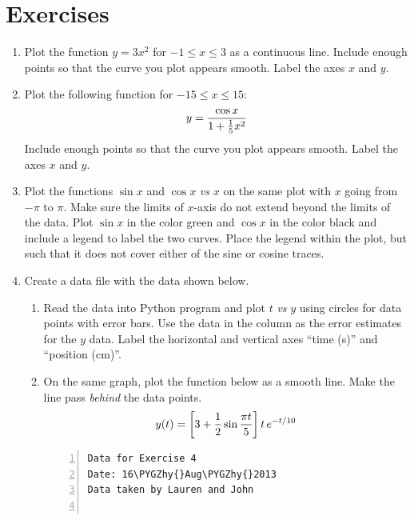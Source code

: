 \documentclass[letterpaper,10pt,english]{sphinxmanual}
\def\PYGZhy{\char`\-}
\begin{document}
\section{Exercises}
\label{chap5/chap5_plot:exercises}\begin{enumerate}
\item {} 
Plot the function \(y=3x^2\) for \(-1 \le x \le 3\) as a continuous line.  Include enough points so that the curve you plot appears smooth.  Label the axes \(x\) and \(y\).

\item {} 
Plot the following function for \(-15 \le x \le 15\):
\begin{gather}
\begin{split}y = \frac{\cos x}{1+\frac{1}{5}x^2}\end{split}\notag
\end{gather}
Include enough points so that the curve you plot appears smooth.  Label the axes \(x\) and \(y\).

\item {} 
Plot the functions \(\sin x\) and \(\cos x\) \emph{vs} \(x\) on the same plot with \(x\) going from \(-\pi\) to \(\pi\).  Make sure the limits of \(x\)-axis do not extend beyond the limits of the data.  Plot \(\sin x\) in the color green and \(\cos x\) in the color black and include a legend to label the two curves.  Place the legend within the plot, but such that it does not cover either of the sine or cosine traces.

\item {} 
Create a data file with the data shown below.
\begin{enumerate}
\item {} 
Read the data into Python program and plot \(t\) \emph{vs} \(y\) using circles for data points with error bars.  Use the data in the  column as the error estimates for the \(y\) data.  Label the horizontal and vertical axes ``time (s)'' and ``position (cm)''.

\item {} 
On the same graph, plot the function below as a smooth line.  Make the line pass \emph{behind} the data points.
\begin{gather}
\begin{split}y(t) = \left[3 +
       \frac{1}{2}\sin\frac{\pi t}{5}\right]
       t\, e^{-t/10}\end{split}\notag
\end{gather}
\begin{Verbatim}[commandchars=\\\{\},numbers=left,firstnumber=1,stepnumber=1]
Data for Exercise 4
Date: 16\PYGZhy{}Aug\PYGZhy{}2013
Data taken by Lauren and John


\end{Verbatim}
\end{enumerate}
\end{enumerate}
\end{document}
